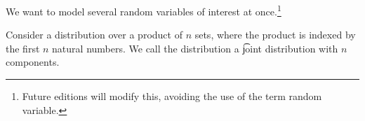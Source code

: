 

We want to model several random variables of interest at once.\footnote{Future editions will modify this, avoiding the use of the term random variable.}


Consider a distribution over a product of $n$ sets, where the product is indexed by the first $n$ natural numbers.
We call the distribution a \t{joint distribution} with $n$ components.

\blankpage
